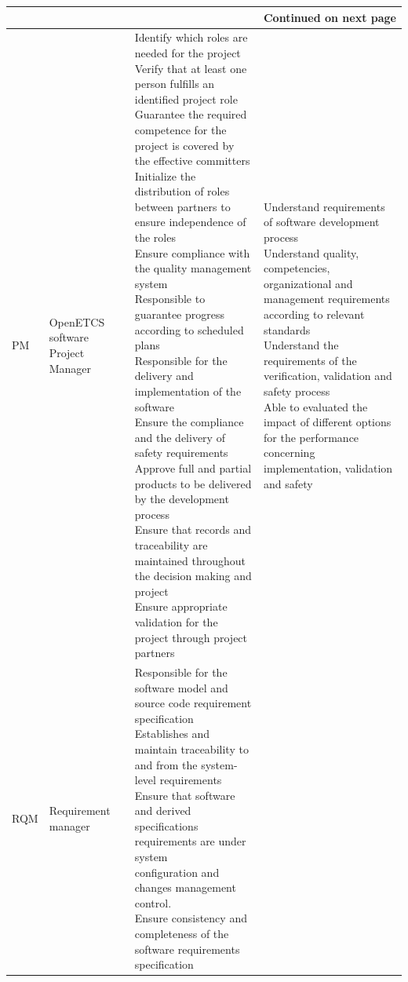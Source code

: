 \documentclass{template/openetcs_article}
\begin{document}
\begin{landscape}
\begin{appendices}
\begin{center}
\begin{longtable}{|m{1cm}|m{}|m{11cm}|m{10cm}|}
\hline \multicolumn{4}{|r|}{{Continued on next page}} \\ \hline
\endfoot

\hline \hline
\endlastfoot

PM &
OpenETCS software Project Manager &
\parbox{11cm}{\raggedright
Identify which roles are needed for the project\\
Verify that at least one person fulfills an identified project role\\
Guarantee the required competence for the project is covered by the effective committers\\
Initialize the distribution of roles between partners to ensure independence of the roles\\
Ensure compliance with the quality management system\\
Responsible to guarantee progress according to scheduled plans\\
Responsible for the delivery and implementation of the software\\
Ensure the compliance and the delivery of safety requirements\\
Approve full and partial products to be delivered by the development process\\
Ensure that records and traceability are maintained throughout the decision making and project\\
Ensure appropriate validation for the project through project partners}
&
\parbox{10cm}{\raggedright
Understand requirements of software development process\\
Understand quality, competencies, organizational and management requirements according to relevant standards\\
Understand the requirements of the verification, validation and safety process\\
Able to evaluated the impact of different options for the performance concerning implementation, validation and safety}
\\\hline
RQM &
Requirement manager &
\parbox{11cm}{\raggedright
Responsible for the software model and source code requirement specification\\
Establishes and maintain traceability to and from the system-level requirements\\
Ensure that software and derived specifications requirements are under system\\ configuration and changes management control.\\
Ensure consistency and completeness of the software requirements specification\\
}
\end{longtable}
\end{center}
\end{appendices}
\end{landscape}
\end{document}
